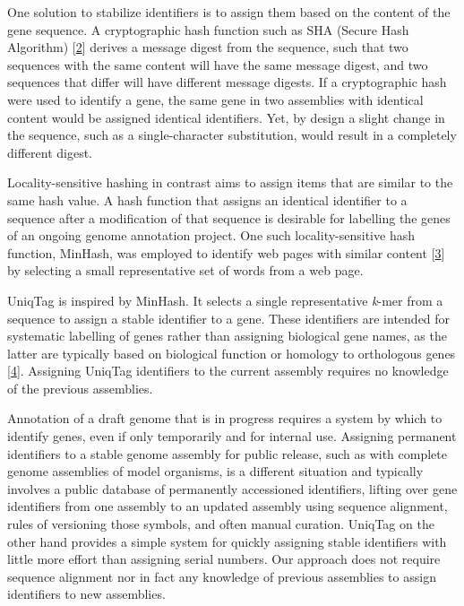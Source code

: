 \documentclass[10pt]{article}
\begin{document}
One solution to stabilize identifiers is to assign them based on the
content of the gene sequence. A cryptographic hash function such as SHA
(Secure Hash Algorithm)
{[}\href{http://www.nist.gov/manuscript-publication-search.cfm?pub_id=910977}{2}{]}
derives a message digest from the sequence, such that two sequences with
the same content will have the same message digest, and two sequences
that differ will have different message digests. If a cryptographic hash
were used to identify a gene, the same gene in two assemblies with
identical content would be assigned identical identifiers. Yet, by
design a slight change in the sequence, such as a single-character
substitution, would result in a completely different digest.

Locality-sensitive hashing in contrast aims to assign items that are
similar to the same hash value. A hash function that assigns an
identical identifier to a sequence after a modification of that sequence
is desirable for labelling the genes of an ongoing genome annotation
project. One such locality-sensitive hash function, MinHash, was
employed to identify web pages with similar content
{[}\href{http://dx.doi.org/10.1109/SEQUEN.1997.666900}{3}{]} by
selecting a small representative set of words from a web page.

UniqTag is inspired by MinHash. It selects a single representative
\emph{k}-mer from a sequence to assign a stable identifier to a gene.
These identifiers are intended for systematic labelling of genes rather
than assigning biological gene names, as the latter are typically based
on biological function or homology to orthologous genes
{[}\href{http://dx.doi.org/10.1006/geno.2002.6748}{4}{]}. Assigning
UniqTag identifiers to the current assembly requires no knowledge of the
previous assemblies.

Annotation of a draft genome that is in progress requires a system by
which to identify genes, even if only temporarily and for internal use.
Assigning permanent identifiers to a stable genome assembly for public
release, such as with complete genome assemblies of model organisms, is
a different situation and typically involves a public database of
permanently accessioned identifiers, lifting over gene identifiers from
one assembly to an updated assembly using sequence alignment, rules of
versioning those symbols, and often manual curation. UniqTag on the
other hand provides a simple system for quickly assigning stable
identifiers with little more effort than assigning serial numbers. Our
approach does not require sequence alignment nor in fact any knowledge
of previous assemblies to assign identifiers to new assemblies.
\end{document}
